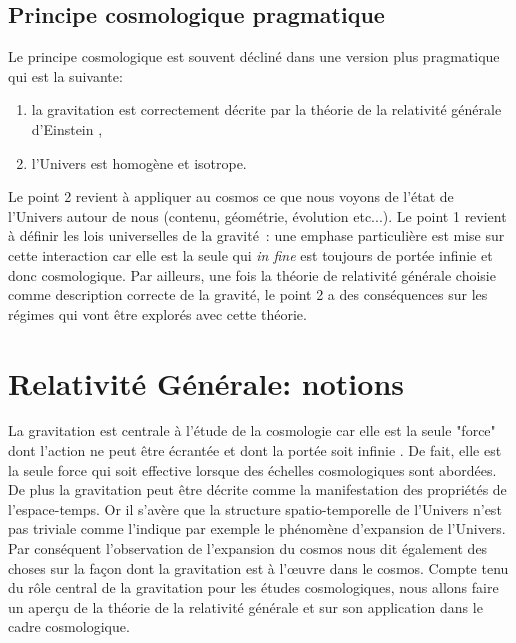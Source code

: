 \subsection{Principe cosmologique pragmatique}
Le principe cosmologique est souvent décliné dans une version plus pragmatique qui est la suivante:
\begin{enumerate}
\item la gravitation est correctement décrite par la théorie de la relativité générale d'Einstein ,
\item l'Univers est homogène et isotrope.
\end{enumerate}
Le point 2 revient à appliquer au cosmos ce que nous voyons de l'état de l'Univers autour de nous (contenu, géométrie, évolution etc...). Le point 1 revient à définir les lois universelles de la gravité~: une emphase particulière est mise sur cette interaction car elle est la seule qui \textit{in fine} est toujours de portée infinie et donc cosmologique. Par ailleurs, une fois la théorie de relativité générale choisie comme description correcte de la gravité, le point 2 a des conséquences sur les régimes qui vont être explorés avec cette théorie.

\section{Relativité Générale: notions}
La gravitation est centrale à l'étude de la cosmologie car elle est la seule "force" dont l'action ne peut être écrantée et dont la portée soit infinie . De fait, elle est la seule force qui soit effective lorsque des échelles cosmologiques sont abordées. De plus la gravitation peut être décrite comme la manifestation des propriétés de l'espace-temps. Or il s'avère que la structure spatio-temporelle de l'Univers n'est pas triviale comme l'indique par exemple le phénomène d'expansion de l'Univers. Par conséquent l'observation de l'expansion du cosmos nous dit également des choses sur la façon dont la gravitation est à l'œuvre dans le cosmos. Compte tenu du rôle central de la gravitation pour les études cosmologiques, nous allons faire un aperçu de la théorie de la relativité générale et sur son application dans le cadre cosmologique.

